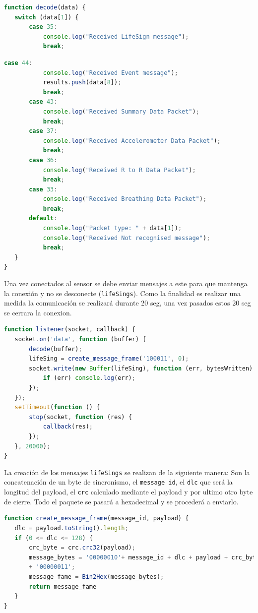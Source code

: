 \begin{lstlisting}[language=JavaScript]
function decode(data) {
   switch (data[1]) {
       case 35:
           console.log("Received LifeSign message");
           break;
           \end{lstlisting}
           \begin{lstlisting}[language=JavaScript]
       case 44:
           console.log("Received Event message");
           results.push(data[8]);
           break;
       case 43:
           console.log("Received Summary Data Packet");
           break;
       case 37:
           console.log("Received Accelerometer Data Packet");
           break;
       case 36:
           console.log("Received R to R Data Packet");
           break;
       case 33:
           console.log("Received Breathing Data Packet");
           break;
       default:
           console.log("Packet type: " + data[1]);
           console.log("Received Not recognised message");
           break;
   }
}
\end{lstlisting}

Una vez conectados al sensor se debe enviar mensajes a este para que mantenga la conexión y no se desconecte (\texttt{lifeSings}). Como la finalidad es realizar una medida la comunicación se realizará durante 20 seg, una vez pasados estos 20 seg se cerrara la conexion. 

\begin{lstlisting}[language=JavaScript]
function listener(socket, callback) {
   socket.on('data', function (buffer) {
       decode(buffer);
       lifeSing = create_message_frame('100011', 0);
       socket.write(new Buffer(lifeSing), function (err, bytesWritten) {
           if (err) console.log(err);
       });
   });
   setTimeout(function () {
       stop(socket, function (res) {
           callback(res);
       });
   }, 20000);
}
\end{lstlisting}

La creación de los mensajes \texttt{lifeSings} se realizan de la siguiente manera: Son la concatenación de un byte de sincronismo, el \texttt{message id}, el \texttt{dlc} que será la longitud del payload, el \texttt{crc} calculado mediante el payload y por ultimo otro byte de cierre. Todo el paquete se pasará a hexadecimal y se procederá a enviarlo.
 \pagebreak
\begin{lstlisting}[language=JavaScript]
function create_message_frame(message_id, payload) {
   dlc = payload.toString().length;
   if (0 <= dlc <= 128) {
       crc_byte = crc.crc32(payload);
       message_bytes = '00000010'+ message_id + dlc + payload + crc_byte 
       + '00000011';
       message_fame = Bin2Hex(message_bytes);
       return message_fame
   }
}
\end{lstlisting}

